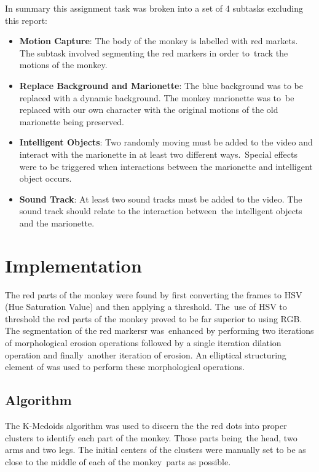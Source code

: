 \documentclass[12pt,a4paper]{article}
\begin{document}
      In summary this assignment task was broken into a set of 4 subtasks excluding this report:
      \begin{itemize}
        \item \textbf{Motion Capture}: The body of the monkey is labelled with red markets. The subtask involved segmenting the red markers in order to\
        track the motions of the monkey.
        \item \textbf{Replace Background and Marionette}: The blue background was to be replaced with a dynamic background. The monkey marionette was to\
        be replaced with our own character with the original motions of the old marionette being preserved.
        \item \textbf{Intelligent Objects}: Two randomly moving must be added to the video and interact with the marionette in at least two different ways.\
        Special effects were to be triggered when interactions between the marionette and intelligent object occurs.
        \item \textbf{Sound Track}: At least two sound tracks must be added to the video. The sound track should relate to the interaction between\
        the intelligent objects and the marionette.
      \end{itemize}

    \section{Implementation}
    The red parts of the monkey were found by first converting the frames to HSV (Hue Saturation Value) and then applying a threshold. The\
    use of HSV to threshold the red parts of the monkey proved to be far superior to using RGB. The segmentation of the red markersr was\
    enhanced by performing two iterations of morphological erosion operations followed by a single iteration dilation operation and finally\
    another iteration of erosion. An elliptical structuring element of was used to perform these morphological operations.

      \subsection{Algorithm}
      The K-Medoids algorithm was used to discern the the red dots into proper clusters to identify each part of the monkey. Those parts being\
      the head, two arms and two legs. The initial centers of the clusters were manually set to be as close to the middle of each of the monkey\
      parts as possible.
\end{document}
